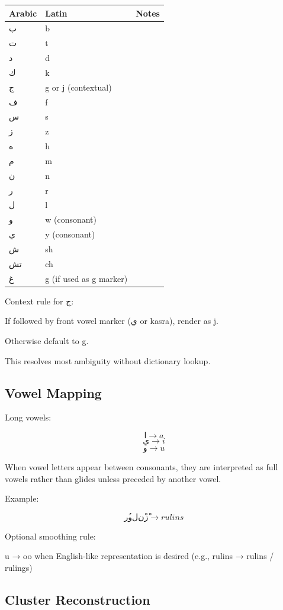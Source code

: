 \documentclass[12pt]{article}
\begin{document}
\begin{center}
\begin{tabular}{lll}
Arabic & Latin & Notes \\
\hline
ب & b \\
ت & t \\
د & d \\
ك & k \\
ج & g or j (contextual) \\
ف & f \\
س & s \\
ز & z \\
ه & h \\
م & m \\
ن & n \\
ر & r \\
ل & l \\
و & w (consonant) \\
ي & y (consonant) \\
ش & sh \\
تش & ch \\
غ & g (if used as g marker) \\
\end{tabular}
\end{center}

Context rule for ج:

If followed by front vowel marker (ي or kasra), render as j.

Otherwise default to g.

This resolves most ambiguity without dictionary lookup.

\subsection{Vowel Mapping}

Long vowels:

\[
ا \rightarrow a
\]
\[
ي \rightarrow i
\]
\[
و \rightarrow u
\]

When vowel letters appear between consonants, they are interpreted as full vowels rather than glides unless preceded by another vowel.

Example:

\[
رُولِنْزْ \rightarrow rulins
\]

Optional smoothing rule:

u → oo when English-like representation is desired (e.g., rulins → rulins / rulings)

\subsection{Cluster Reconstruction}
\end{document}

